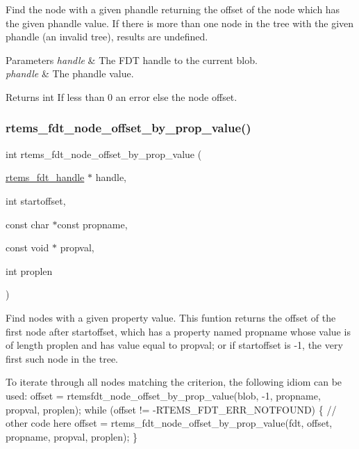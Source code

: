 Find the node with a given phandle returning the offset of the node which has the given phandle value. If there is more than one node in the tree with the given phandle (an invalid tree), results are undefined.


\begin{DoxyParams}{Parameters}
{\em handle} & The F\+DT handle to the current blob. \\
\hline
{\em phandle} & The phandle value. \\
\hline
\end{DoxyParams}
\begin{DoxyReturn}{Returns}
int If less than 0 an error else the node offset. 
\end{DoxyReturn}
\mbox{\label{rtems-fdt_8h_acc37bcb0ea7b3d2a6f1c9bb9369305c4}} 
\subsubsection{\texorpdfstring{rtems\_fdt\_node\_offset\_by\_prop\_value()}{rtems\_fdt\_node\_offset\_by\_prop\_value()}}
{\footnotesize\ttfamily int rtems\+\_\+fdt\+\_\+node\+\_\+offset\+\_\+by\+\_\+prop\+\_\+value (\begin{DoxyParamCaption}\item[{\mbox{\hyperlink{structrtems__fdt__handle}{rtems\+\_\+fdt\+\_\+handle}} $\ast$}]{handle,  }\item[{int}]{startoffset,  }\item[{const char $\ast$const}]{propname,  }\item[{const void $\ast$}]{propval,  }\item[{int}]{proplen }\end{DoxyParamCaption})}

Find nodes with a given property value. This funtion returns the offset of the first node after startoffset, which has a property named propname whose value is of length proplen and has value equal to propval; or if startoffset is -\/1, the very first such node in the tree.

To iterate through all nodes matching the criterion, the following idiom can be used\+: offset = rtemsfdt\+\_\+node\+\_\+offset\+\_\+by\+\_\+prop\+\_\+value(blob, -\/1, propname, propval, proplen); while (offset != -\/R\+T\+E\+M\+S\+\_\+\+F\+D\+T\+\_\+\+E\+R\+R\+\_\+\+N\+O\+T\+F\+O\+U\+ND) \{ // other code here offset = rtems\+\_\+fdt\+\_\+node\+\_\+offset\+\_\+by\+\_\+prop\+\_\+value(fdt, offset, propname, propval, proplen); \}

